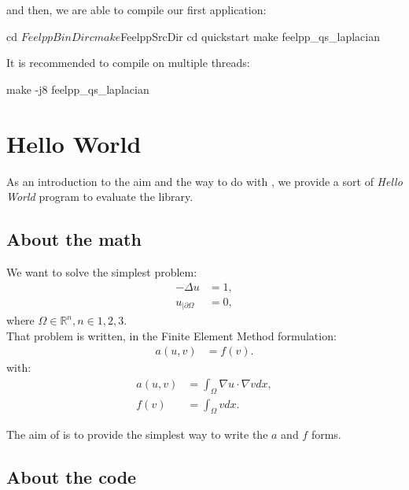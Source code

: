 and then, we are able to compile our first application:
\begin{unixcom}
  cd $FeelppBinDir
  cmake $FeelppSrcDir
  cd quickstart
  make feelpp_qs_laplacian
\end{unixcom}
It is recommended to compile on multiple threads:
\begin{unixcom}
  make -j8 feelpp_qs_laplacian
\end{unixcom}

\section{\feel Hello World}
\label{sec:feel-hello-world}

As an introduction to the aim and the way to do with \feel, we provide a sort of
\textit{Hello World} program to evaluate the library.

\subsection{About the math}
\label{sec:about-math}

We want to solve the simplest problem:
\begin{equation}\nonumber
  \begin{aligned}
    - \Delta u &= 1,\\
    u_{|\partial \Omega} &= 0,
  \end{aligned}
\end{equation}
where $\Omega \in \mathbb{R}^n, n\in{1,2,3}$.\\

That problem is written, in the Finite Element Method formulation:
\begin{equation}\nonumber
  \begin{aligned}
    a\left( u,v \right)&=f(v).
  \end{aligned}
\end{equation}
with:
\begin{equation}\nonumber
  \begin{aligned}
    a\left( u,v \right)&=\int_{\Omega} \nabla u \cdot \nabla v dx,\\
    f\left( v \right) &= \int_{\Omega} v dx.
  \end{aligned}
\end{equation}

The aim of \feel is to provide the simplest way to write the $a$ and $f$ forms.

\subsection{About the code}
\label{sec:about-code}

